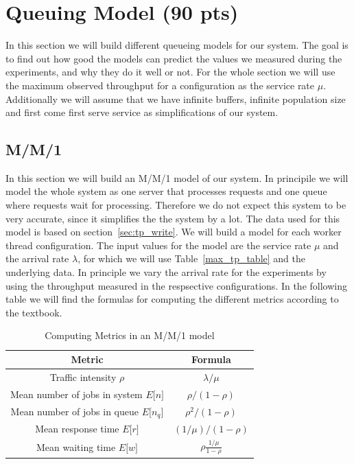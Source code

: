 \documentclass[11pt,a4paper]{article}
\newcommand{\expval}[1]{
	E\text{[}#1\text{]}
	}
\begin{document}
\section{Queuing Model (90 pts)}
%
In this section we will build different queueing models for our system.
%
The goal is to find out how good the models can predict the values we measured during the experiments, and why they do it well or not.
%
For the whole section we will use the maximum observed throughput for a configuration as the service rate $\mu$.
%
Additionally we will assume that we have infinite buffers, infinite population size and first come first serve service as simplifications of our system.
%
\subsection{M/M/1}
%
In this section we will build an M/M/1 model of our system. 
%
In principile we will model the whole system as one server that processes requests and one queue where requests wait for processing.
%
Therefore we do not expect this system to be very accurate, since it simplifies the the system by a lot.
%
The data used for this model is based on section~\ref{sec:tp_write}.
%
We will build a model for each worker thread configuration.
%
The input values for the model are the service rate $\mu$ and the arrival rate $\lambda$, for which we will use Table~\ref{max_tp_table} and the underlying data.
%
In principle we vary the arrival rate for the experiments by using the throughput measured in the respsective configurations.
%
In the following table we will find the formulas for computing the different metrics according to the textbook.
%
\begin{table}
	\centering
	\scriptsize{
	\def\arraystretch{1.25}
		\begin{tabular}{c|c}
			\textbf{Metric} & \textbf{Formula}\\
			\hline
			Traffic intensity $\rho$ & $\lambda / \mu$			\\
			Mean number of jobs in system $\expval{n}$ & $\rho/(1-\rho)$\\
			Mean number of jobs in queue $\expval{n_q}$ & $\rho^2/(1-\rho)$\\
			Mean response time $\expval{r}$ & $(1/\mu)/(1-\rho)$\\
			Mean waiting time $\expval{w}$ & $\rho\frac{1/\mu}{1-\rho}$\\
		\end{tabular}
		\caption{Computing Metrics in an M/M/1 model}
		\label{tab:mm1_deriv}	
	\def\arraystretch{1}
}
\end{table}	
\end{document}
